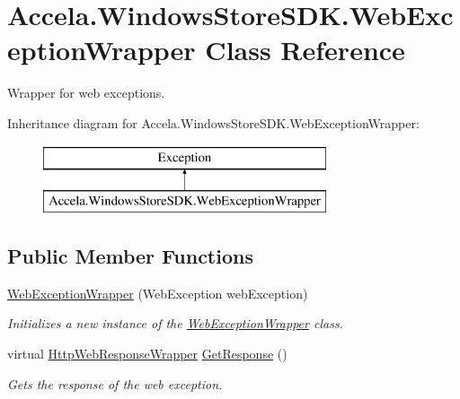 \hypertarget{class_accela_1_1_windows_store_s_d_k_1_1_web_exception_wrapper}{\section{Accela.\+Windows\+Store\+S\+D\+K.\+Web\+Exception\+Wrapper Class Reference}
\label{class_accela_1_1_windows_store_s_d_k_1_1_web_exception_wrapper}
}


Wrapper for web exceptions.  


Inheritance diagram for Accela.\+Windows\+Store\+S\+D\+K.\+Web\+Exception\+Wrapper\+:\begin{figure}[H]
\begin{center}
\leavevmode
\includegraphics[height=2.000000cm]{class_accela_1_1_windows_store_s_d_k_1_1_web_exception_wrapper}
\end{center}
\end{figure}
\subsection*{Public Member Functions}
\begin{DoxyCompactItemize}
\item 
\hyperlink{class_accela_1_1_windows_store_s_d_k_1_1_web_exception_wrapper_a9cd7d350bc8a0818eeb792b38d45e35d}{Web\+Exception\+Wrapper} (Web\+Exception web\+Exception)
\begin{DoxyCompactList}\small\item\em Initializes a new instance of the \hyperlink{class_accela_1_1_windows_store_s_d_k_1_1_web_exception_wrapper}{Web\+Exception\+Wrapper} class. \end{DoxyCompactList}\item 
virtual \hyperlink{class_accela_1_1_windows_store_s_d_k_1_1_http_web_response_wrapper}{Http\+Web\+Response\+Wrapper} \hyperlink{class_accela_1_1_windows_store_s_d_k_1_1_web_exception_wrapper_abdf8fb02d013afe65110137a37c755cc}{Get\+Response} ()
\begin{DoxyCompactList}\small\item\em Gets the response of the web exception. \end{DoxyCompactList}\end{DoxyCompactItemize}

